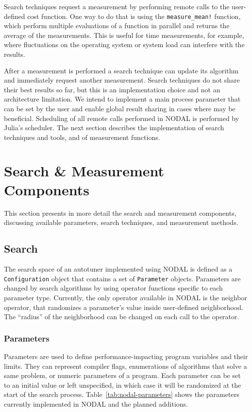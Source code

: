 Search techniques request a measurement by performing remote calls to the
user-defined cost function. One way to do that is using the
\texttt{measure\_mean!} function, which perform multiple evaluations of a
function in parallel and returns the average of the measurements.  This is
useful for time measurements, for example, where fluctuations on the operating
system or system load can interfere with the results.

After a measurement is performed a search technique can update its algorithm
and immediately request another measurement.  Search techniques do not share
their best results so far, but this is an implementation choice and not an
architecture limitation.  We intend to implement a main process parameter that
can be set by the user and enable global result sharing in cases where may be
beneficial.  Scheduling of all remote calls performed in NODAL is performed by
Julia's scheduler. The next section describes the implementation of search
techniques and tools, and of measurement functions.

\section{Search \& Measurement Components}
\label{sec:nodal-components}

This section presents in more detail the search and measurement components,
discussing available parameters, search techniques, and measurement methods.

\subsection{Search}

The search space of an autotuner implemented using NODAL is defined as a
\texttt{Configuration} object that contains a set of \texttt{Parameter}
objects. Parameters are changed by search algorithms by using operator
functions specific to each parameter type. Currently, the only operator
available in NODAL is the neighbor operator, that randomizes a parameter's
value inside user-defined neighborhood. The ``radius'' of the neighborhood
can be changed on each call to the operator.

\subsubsection{Parameters}

Parameters are used to define performance-impacting program variables and their
limits. They can represent compiler flags, enumerations of algorithms that
solve a same problem, or numeric parameters of a program. Each parameter can be
set to an initial value or left unspecified, in which case it will be
randomized at the start of the search process.
Table~\ref{tab:nodal-parameters} shows the parameters currently implemented in
NODAL and the planned additions.

